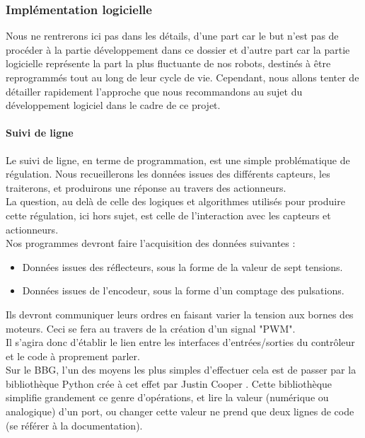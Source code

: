 	\subsubsection{Implémentation logicielle}

		Nous ne rentrerons ici pas dans les détails, d'une part car le but n'est pas de procéder à la partie développement dans ce dossier et d'autre part car la partie logicielle représente la part la plus fluctuante de nos robots, destinés à être reprogrammés tout au long de leur cycle de vie. Cependant, nous allons tenter de détailler rapidement l'approche que nous recommandons au sujet du développement logiciel dans le cadre de ce projet.

		\paragraph{Suivi de ligne}

			Le suivi de ligne, en terme de programmation, est une simple problématique de régulation. Nous recueillerons les données issues des différents capteurs, les traiterons, et produirons une réponse au travers des actionneurs.\\

			La question, au delà de celle des logiques et algorithmes utilisés pour produire cette régulation, ici hors sujet, est celle de l’interaction avec les capteurs et actionneurs.\\

			Nos programmes devront faire l'acquisition des données suivantes :
			\begin{itemize}
				\item Données issues des réflecteurs, sous la forme de la valeur de sept tensions.
				\item Données issues de l'encodeur, sous la forme d'un comptage des pulsations.
			\end{itemize}

			Ils devront communiquer leurs ordres en faisant varier la tension aux bornes des moteurs. Ceci se fera au travers de la création d'un signal "PWM".\\

			Il s'agira donc d'établir le lien entre les interfaces d'entrées/sorties du contrôleur et le code à proprement parler.\\

			Sur le BBG, l'un des moyens les plus simples d'effectuer cela est de passer par la bibliothèque Python crée à cet effet par Justin Cooper \cite{bib14} \cite{bib15}. Cette bibliothèque simplifie grandement ce genre d'opérations, et lire la valeur (numérique ou analogique) d'un port, ou changer cette valeur ne prend que deux lignes de code (se référer à la documentation).\\

